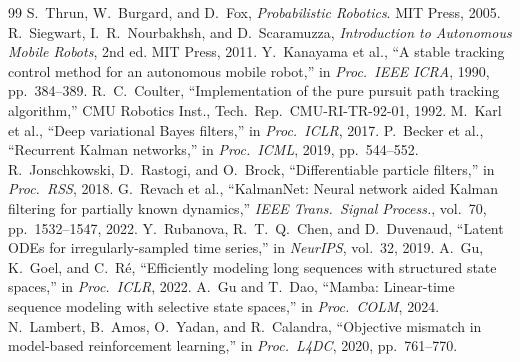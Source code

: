 \documentclass[10pt]{article}
\begin{document}
\begin{thebibliography}{99}
\small
{} S.\ Thrun, W.\ Burgard, and D.\ Fox, \emph{Probabilistic Robotics}. MIT Press, 2005.
 R.\ Siegwart, I.\ R.\ Nourbakhsh, and D.\ Scaramuzza, \emph{Introduction to Autonomous Mobile Robots}, 2nd ed. MIT Press, 2011.
 Y.\ Kanayama et al., ``A stable tracking control method for an autonomous mobile robot,'' in \emph{Proc.\ IEEE ICRA}, 1990, pp.\ 384--389.
 R.\ C.\ Coulter, ``Implementation of the pure pursuit path tracking algorithm,'' CMU Robotics Inst., Tech.\ Rep.\ CMU-RI-TR-92-01, 1992.
 M.\ Karl et al., ``Deep variational Bayes filters,'' in \emph{Proc.\ ICLR}, 2017.
 P.\ Becker et al., ``Recurrent Kalman networks,'' in \emph{Proc.\ ICML}, 2019, pp.\ 544--552.
 R.\ Jonschkowski, D.\ Rastogi, and O.\ Brock, ``Differentiable particle filters,'' in \emph{Proc.\ RSS}, 2018.
 G.\ Revach et al., ``KalmanNet: Neural network aided Kalman filtering for partially known dynamics,'' \emph{IEEE Trans.\ Signal Process.}, vol.\ 70, pp.\ 1532--1547, 2022.
 Y.\ Rubanova, R.\ T.\ Q.\ Chen, and D.\ Duvenaud, ``Latent ODEs for irregularly-sampled time series,'' in \emph{NeurIPS}, vol.\ 32, 2019.
 A.\ Gu, K.\ Goel, and C.\ R\'e, ``Efficiently modeling long sequences with structured state spaces,'' in \emph{Proc.\ ICLR}, 2022.
 A.\ Gu and T.\ Dao, ``Mamba: Linear-time sequence modeling with selective state spaces,'' in \emph{Proc.\ COLM}, 2024.
 N.\ Lambert, B.\ Amos, O.\ Yadan, and R.\ Calandra, ``Objective mismatch in model-based reinforcement learning,'' in \emph{Proc.\ L4DC}, 2020, pp.\ 761--770.
\end{thebibliography}
\end{document}
